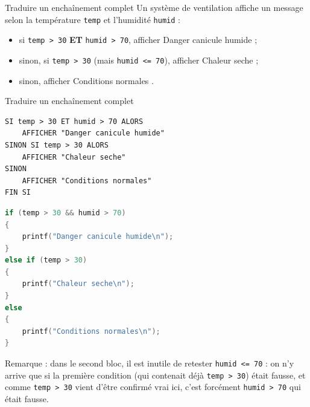 \begin{UPSTIexercice}{Traduire un enchaînement complet}
    Un système de ventilation affiche un message selon la température \texttt{temp} et l'humidité \texttt{humid} :
    \begin{itemize}
        \item si \texttt{temp > 30} \textbf{ET} \texttt{humid > 70}, afficher \og Danger canicule humide \fg{} ;
        \item sinon, si \texttt{temp > 30} (mais \texttt{humid <= 70}), afficher \og Chaleur seche \fg{} ;
        \item sinon, afficher \og Conditions normales \fg.
    \end{itemize}


\end{UPSTIexercice}

\begin{UPSTIprofOnlyEnv}
    \begin{UPSTIcorrectionP}{Traduire un enchaînement complet}
        \begin{verbatim}
SI temp > 30 ET humid > 70 ALORS
    AFFICHER "Danger canicule humide"
SINON SI temp > 30 ALORS
    AFFICHER "Chaleur seche"
SINON
    AFFICHER "Conditions normales"
FIN SI
        \end{verbatim}
        \begin{lstlisting}[language=C]
if (temp > 30 && humid > 70)
{
    printf("Danger canicule humide\n");
}
else if (temp > 30)
{
    printf("Chaleur seche\n");
}
else
{
    printf("Conditions normales\n");
}
        \end{lstlisting}
        Remarque : dans le second bloc, il est inutile de retester \texttt{humid <= 70} : on n'y arrive que si la première condition (qui contenait déjà \texttt{temp > 30}) était fausse, et comme \texttt{temp > 30} vient d'être confirmé vrai ici, c'est forcément \texttt{humid > 70} qui était fausse.
    \end{UPSTIcorrectionP}
\end{UPSTIprofOnlyEnv}
